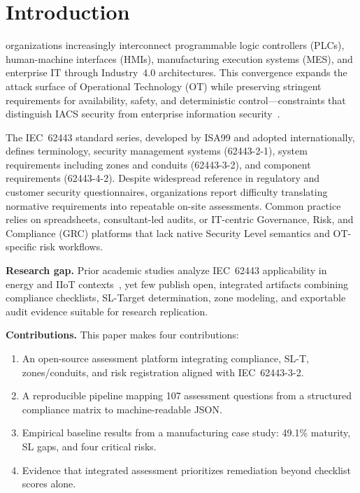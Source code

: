 \documentclass[conference]{IEEEtran}
\begin{document}
\section{Introduction}
 organizations increasingly interconnect programmable logic controllers (PLCs), human-machine interfaces (HMIs), manufacturing execution systems (MES), and enterprise IT through Industry~4.0 architectures. This convergence expands the attack surface of Operational Technology (OT) while preserving stringent requirements for availability, safety, and deterministic control---constraints that distinguish IACS security from enterprise information security~\cite{stouffer2023nist825}.

The IEC~62443 standard series, developed by ISA99 and adopted internationally, defines terminology, security management systems (62443-2-1), system requirements including zones and conduits (62443-3-2), and component requirements (62443-4-2). Despite widespread reference in regulatory and customer security questionnaires, organizations report difficulty translating normative requirements into repeatable on-site assessments. Common practice relies on spreadsheets, consultant-led audits, or IT-centric Governance, Risk, and Compliance (GRC) platforms that lack native Security Level semantics and OT-specific risk workflows.

\textbf{Research gap.} Prior academic studies analyze IEC~62443 applicability in energy and IIoT contexts~\cite{vtt2018industrial}, yet few publish open, integrated artifacts combining compliance checklists, SL-Target determination, zone modeling, and exportable audit evidence suitable for research replication.

\textbf{Contributions.} This paper makes four contributions:
\begin{enumerate}
    \item An open-source assessment platform integrating compliance, SL-T, zones/conduits, and risk registration aligned with IEC~62443-3-2.
    \item A reproducible pipeline mapping 107 assessment questions from a structured compliance matrix to machine-readable JSON.
    \item Empirical baseline results from a manufacturing case study: 49.1\% maturity, SL gaps, and four critical risks.
    \item Evidence that integrated assessment prioritizes remediation beyond checklist scores alone.
\end{enumerate}
\end{document}
